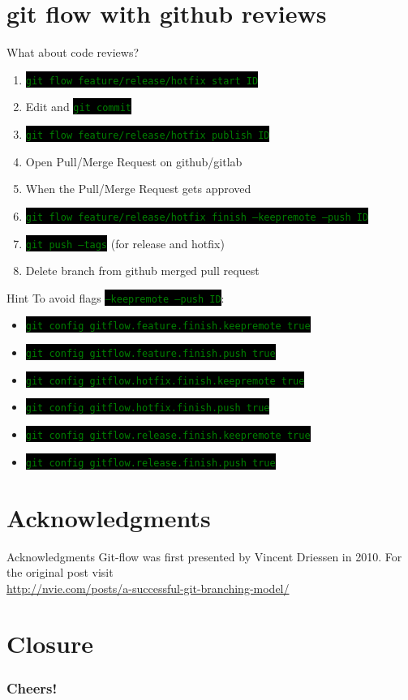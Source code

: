 \documentclass[
14pt,
aspectratio=169,
usenames,
dvipsnames,
x11names]{beamer}
\newcommand{\code}[1]{{\small\setlength{\fboxsep}{2pt}\colorbox{black}{\textcolor{green}{\texttt{#1}}}}}
\begin{document}
\section{git flow with github reviews}

\begin{frame}{What about code reviews?}
  \begin{enumerate} \setlength{\itemsep}{\fill}
  \item \code{git flow feature/release/hotfix start ID}
  \item Edit and \code{git commit}
  \item \code{git flow feature/release/hotfix publish ID}
  \item Open Pull/Merge Request on github/gitlab
  \item When the Pull/Merge Request gets approved
  \item \code{git flow feature/release/hotfix finish --keepremote --push ID}
  \item \code{git push --tags} (for release and hotfix)
  \item Delete branch from github merged pull request
  \end{enumerate}
\end{frame}

\begin{frame}{Hint}
  To avoid flags \code{--keepremote --push ID}:

  \begin{itemize}
  \item \code{git config gitflow.feature.finish.keepremote true}
  \item \code{git config gitflow.feature.finish.push true}
  \item \code{git config gitflow.hotfix.finish.keepremote true}
  \item \code{git config gitflow.hotfix.finish.push true}
  \item \code{git config gitflow.release.finish.keepremote true}
  \item \code{git config gitflow.release.finish.push true}
\end{itemize}
\end{frame}

\section{Acknowledgments}

\begin{frame}{Acknowledgments}
  Git-flow was first presented by \alert{Vincent Driessen} in 2010.
  \vfill
  For the original post visit\\
  {\small\url{http://nvie.com/posts/a-successful-git-branching-model/}}
\end{frame}

\section{Closure}
{
\begin{frame}[noframenumbering]
 \frametitle{\textbf{Cheers!}}
 \centering
 \titlepage
\end{frame}
}

\end{document}
